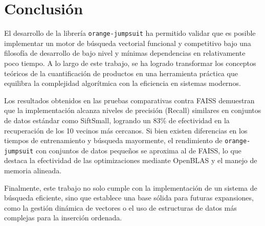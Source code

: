 \section{Conclusi\'on}

El desarrollo de la librer\'ia \texttt{orange-jumpsuit}
ha permitido validar que es posible implementar un motor de b\'usqueda
vectorial funcional y competitivo bajo una filosof\'ia de desarrollo de bajo
nivel y m\'inimas dependencias en relativamente poco tiempo. 
A lo largo de este trabajo, se ha logrado transformar los conceptos te\'oricos
de la cuantificaci\'on de productos en una herramienta pr\'actica que equilibra
la complejidad algor\'itmica con la eficiencia en sistemas modernos.

Los resultados obtenidos en las pruebas comparativas contra FAISS demuestran
que la implementación alcanza niveles de precisi\'on (Recall) similares
en conjuntos de datos est\'andar como SiftSmall, logrando un 83\% de
efectividad en la recuperación de los 10 vecinos más cercanos.
Si bien existen diferencias en los tiempos de entrenamiento y
b\'usqueda mayormente, el rendimiento de \texttt{orange-jumpsuit} con conjuntos
de datos peque\~nos se aproxima al de FAISS, lo que destaca la efectividad
de las optimizaciones mediante OpenBLAS y el manejo de memoria alineada.

Finalmente, este trabajo no solo cumple con la implementaci\'on de un sistema
de b\'usqueda eficiente, sino que establece una base s\'olida para futuras
expansiones, como la gesti\'on din\'amica de vectores o el uso de estructuras
de datos m\'as complejas para la inserci\'on ordenada. 

